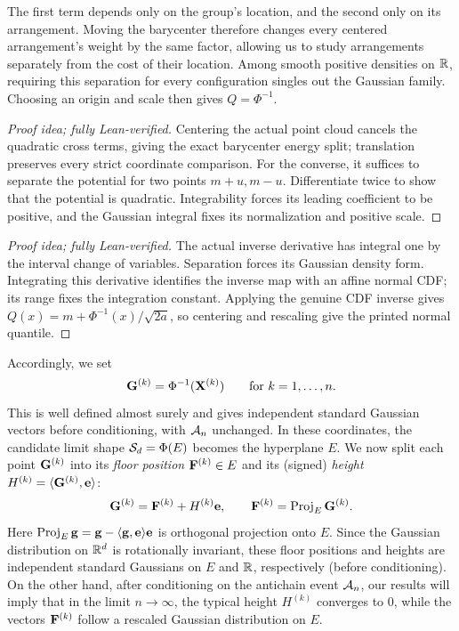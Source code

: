 \documentclass[11pt,letterpaper]{article}
\begin{document}
The first term depends only on the group's location, and the second only on its arrangement. Moving the barycenter therefore changes every centered arrangement's weight by the same factor, allowing us to study arrangements separately from the cost of their location. Among smooth positive densities on $\mathbb R$, requiring this separation for every configuration singles out the Gaussian family. Choosing an origin and scale then gives $Q=\Phi^{-1}$.

\begin{proof}[Proof idea; fully Lean-verified]
Centering the actual point cloud cancels the quadratic cross terms, giving the exact barycenter energy split; translation preserves every strict coordinate comparison. For the converse, it suffices to separate the potential for two points $m+u,m-u$. Differentiate twice to show that the potential is quadratic. Integrability forces its leading coefficient to be positive, and the Gaussian integral fixes its normalization and positive scale.
\end{proof}

\begin{proof}[Proof idea; fully Lean-verified]
The actual inverse derivative has integral one by the interval change of variables. Separation forces its Gaussian density form. Integrating this derivative identifies the inverse map with an affine normal CDF; its range fixes the integration constant. Applying the genuine CDF inverse gives $Q(x)=m+\Phi^{-1}(x)/\sqrt{2a}$, so centering and rescaling give the printed normal quantile.
\end{proof}

Accordingly, we set
\begin{equation}\label{eq:transform_Phi}
      \mathbf G^{(k)}=\Phi^{-1}(\mathbf X^{(k)})\qquad \text{for $k=1,\ldots,n$}.
\end{equation}
This is well defined almost surely and gives independent standard Gaussian vectors before conditioning, with $\mathcal A_n$ unchanged. In these coordinates, the candidate limit shape $\mathcal S_d=\Phi(E)$ becomes the hyperplane $E$. We now split each point $\mathbf G^{(k)}$ into its {\em floor position} $\mathbf F^{(k)}\in E$ and its (signed) {\em height} $H^{(k)}=\langle\mathbf G^{(k)},\mathbf e\rangle$:
\begin{equation}\label{eq:split}
      \mathbf G^{(k)}=\mathbf F^{(k)}+H^{(k)}\mathbf e,\qquad \mathbf F^{(k)}=\operatorname{Proj}_E\mathbf G^{(k)}.
\end{equation}
Here $\operatorname{Proj}_E\mathbf g=\mathbf g-\langle\mathbf g,\mathbf e\rangle\mathbf e$ is orthogonal projection onto $E$.
Since the Gaussian distribution on $\mathbb R^{d}$ is rotationally invariant, these floor positions and heights are independent standard Gaussians on $E$ and $\mathbb R$, respectively (before conditioning). On the other hand, after conditioning on the antichain event $\mathcal A_{n}$, our results will imply that in the limit $n\to\infty$, the typical height $H^{(k)}$ converges to $0$, while the vectors $\mathbf F^{(k)}$ follow a rescaled Gaussian distribution on $E$.
\end{document}
